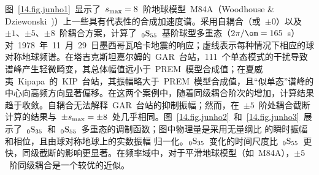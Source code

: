 图~\ref{14.fig.junho1}~显示了~$s_{\rm max}=8$~阶地球模型~M84A（Woodhouse \& Dziewonski~\citeyear{woodhouse&dziewonski84})）上一些具有代表性的合成加速度谱。采用自耦合（或~$\pm0$）以及~$\pm 1$、$\pm 5$、$\pm 8$~阶耦合方案，计算了~${}_0{\rm S}_{55}$~基阶球型多重态（$2\pi/\om=165$~s）对~1978~年~11~月~29~日墨西哥瓦哈卡地震的响应；虚线表示每种情况下相应的球对称地球频谱。在塔吉克斯坦嘉尔姆的~GAR~台站，111~个单态模式的干扰导致谱峰产生轻微畸变，其总体幅值远小于~PREM~模型合成值；在夏威夷~Kipapa~的~KIP~台站，其振幅略大于~PREM~模型合成值，且“似单态”谱峰的中心向高频方向显著偏移。在这两个案例中，随着同级耦合阶次的增加，计算结果趋于收敛。自耦合无法解释~GAR~台站的抑制振幅；然而，在~$\pm 5$~阶处耦合截断计算的结果与~$\pm s_{\rm max}=\pm 8$~处几乎相同。图~\ref{14.fig.junho2}~和~\ref{14.fig.junho3}~展示了~${}_0{\rm S}_{35}$~和~${}_0{\rm S}_{55}$~多重态的调制函数；图中物理量是采用无量纲比 的瞬时振幅和相位，且由球对称地球上的实数振幅 归一化。${}_0{\rm S}_{35}$~变化的时间尺度比~${}_0{\rm S}_{55}$~更快，同级截断的影响更显著。在频率域中，对于平滑地球模型（如~M84A），$\pm 5$~阶同级耦合是一个较优的近似。


